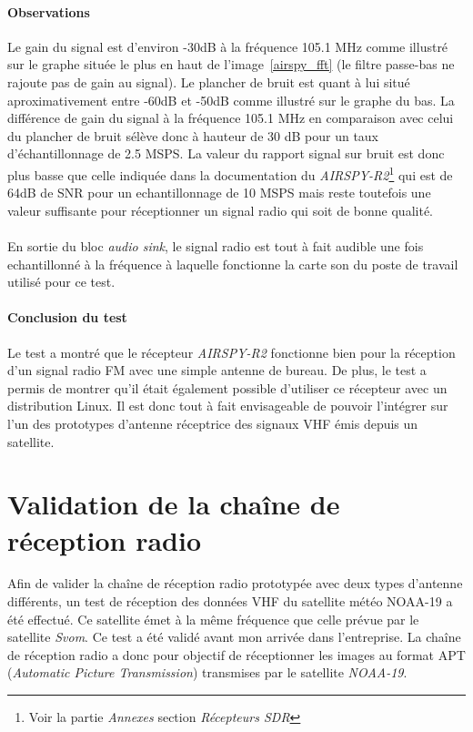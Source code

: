 \documentclass[12pt,fleqn]{book} %
\begin{document}
\subsubsection{Observations}
Le gain du signal est d'environ -30dB à la fréquence 105.1 MHz comme illustré sur le graphe située le plus en haut de l'image~\ref{airspy_fft} (le filtre passe-bas ne rajoute pas de gain au signal). Le plancher de bruit est quant à lui situé aproximativement entre -60dB et -50dB comme illustré sur le graphe du bas. La différence de gain du signal à la fréquence 105.1 MHz en comparaison avec celui du plancher de bruit sélève donc à hauteur de 30 dB pour un taux d'échantillonnage de 2.5 MSPS.
La valeur du rapport signal sur bruit est donc plus basse que celle indiquée dans la documentation du \emph{AIRSPY-R2}\footnote{Voir la partie \emph{Annexes} section \emph{Récepteurs SDR}} qui est de 64dB de SNR pour un echantillonnage de 10 MSPS mais reste toutefois une valeur suffisante pour réceptionner un signal radio qui soit de bonne qualité.
~\\\\En sortie du bloc \emph{audio sink}, le signal radio est tout à fait audible une fois echantillonné à la fréquence à laquelle fonctionne la carte son du poste de travail utilisé pour ce test.
\subsubsection{Conclusion du test}
Le test a montré que le récepteur \emph{AIRSPY-R2} fonctionne bien pour la réception d'un signal radio FM avec une simple antenne de bureau. De plus, le test a permis de montrer qu'il était également possible d'utiliser ce récepteur avec un distribution Linux.
Il est donc tout à fait envisageable de pouvoir l'intégrer sur l'un des prototypes d'antenne réceptrice des signaux VHF émis depuis un satellite.

\chapter{Validation de la chaîne de réception radio}
Afin de valider la chaîne de réception radio prototypée avec deux types d'antenne différents, un test de réception des données VHF du satellite météo NOAA-19 a été effectué. Ce satellite émet à la même fréquence que celle prévue par le satellite \emph{Svom}. Ce test a été validé avant mon arrivée dans l'entreprise.
La chaîne de réception radio a donc pour objectif de réceptionner les images au format APT (\emph{Automatic Picture Transmission}) transmises par le satellite \emph{NOAA-19}.
\end{document}
